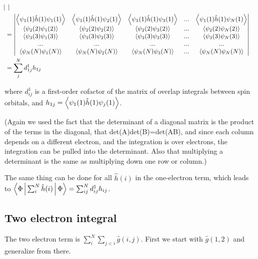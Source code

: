 \documentclass[a4paper]{article}
\begin{document}
\begin{equation}
\begin{aligned}
{\begin{vmatrix}
    \end{vmatrix} } \\
        &= 
   \begin{vmatrix}  
     \Braket{\psi_1(1) \hat{h}(1)\psi_1(1) }&  \Braket{\psi_1(1)\hat{h}(1)\psi_2(1)}& \Braket{\psi_1(1)\hat{h}(1)\psi_3(1) }& ... &  \Braket{\psi_1(1)\hat{h}(1) \psi_N(1) }\\
     \Braket{\psi_2(2) \psi_1(2) }&  \Braket{\psi_2(2)\psi_2(2)} &  \Braket{\psi_2(2) \psi_3(2) }&...& \Braket{ \psi_2(2)\psi_N(2)} \\
     \Braket{\psi_3(3) \psi_1(3)} &  \Braket{\psi_3(3)\psi_2(3) }&  \Braket{\psi_3(3) \psi_3(3)} &...& \Braket{ \psi_3(3)\psi_N(3) }\\
    ... & ... & ... & ...& ... \\
    \Braket{ \psi_N(N) \psi_1(N) }& \Braket{\psi_N(N) \psi_2(N) }&  \Braket{\psi_N(N) \psi_3(N)} &...&  \Braket{\psi_N(N)\psi_N(N)}\\
    \end{vmatrix}  
     \\   &= 
     \sum_j^N d^1_{1j}h_{1j} 
    \label{deriv_onee}
 \end{aligned}
 \end{equation}

where $d^1_{ij}$ is a first-order cofactor of the matrix of overlap integrals between spin orbitals, and $h_{1j} = \Braket{ \psi_1(1) \hat{h}(1)\psi_j(1) }$. 

(Again we used the fact that the determinant of a diagonal matrix is the product of the terms in the diagonal, that det(A)det(B)=det(AB), and since each column depends on a different electron, and the integration is over electrons, the integration can be pulled into the determinant. Also that multiplying a determinant is the same as multiplying down one row or column.)

The same thing can be done for all $\hat{h}(i)$ in the one-electron term, which leads to $\Braket{\Phi| \sum_i^N\hat{h}(i) |\Phi} =  \sum_{ij}^{N} d^1_{ij} h_{ij} $.


\subsection{Two electron integral}

The two electron term is $\displaystyle \sum_i^N\sum_{j<i} \hat{g}(i,j)$. First we start with $\hat{g}(1,2)$ and generalize from there.
\end{document}
